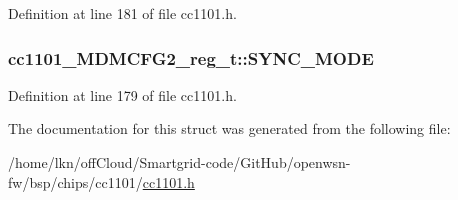 Definition at line 181 of file cc1101.\+h.

\subsubsection[{\texorpdfstring{S\+Y\+N\+C\+\_\+\+M\+O\+DE}{SYNC_MODE}}]{ cc1101\+\_\+\+M\+D\+M\+C\+F\+G2\+\_\+reg\+\_\+t\+::\+S\+Y\+N\+C\+\_\+\+M\+O\+DE}\hypertarget{structcc1101___m_d_m_c_f_g2__reg__t_ac9c472942a256773a5d585c2f99a92cb}{}\label{structcc1101___m_d_m_c_f_g2__reg__t_ac9c472942a256773a5d585c2f99a92cb}


Definition at line 179 of file cc1101.\+h.



The documentation for this struct was generated from the following file\+:\begin{DoxyCompactItemize}
\item 
/home/lkn/off\+Cloud/\+Smartgrid-\/code/\+Git\+Hub/openwsn-\/fw/bsp/chips/cc1101/\hyperlink{cc1101_8h}{cc1101.\+h}\end{DoxyCompactItemize}
